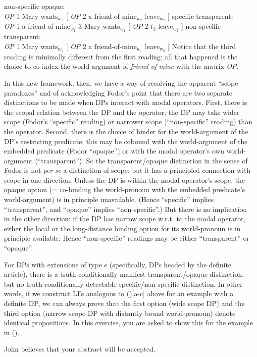 \pex
\a non-specific opaque:\\
\emph{OP} 1 Mary wants$_{w_1}$ [ \emph{OP} 2 a friend-of-mine$_{w_2}$ leave$_{w_2}$ ]
\a specific transparent:\\
\emph{OP} 1 a friend-of-mine$_{w_1}$ 3 Mary wants$_{w_1}$ [ \emph{OP} 2 $t_3$ leave$_{w_2}$
]
\a non-specific transparent:\\
\emph{OP} 1 Mary wants$_{w_1}$ [ \emph{OP} 2 a friend-of-mine$_{w_1}$ leave$_{w_2}$ ]
\xe
%
Notice that the third reading is minimally different from the first reading: all
that happened is the choice to co-index the world argument of \emph{friend of
  mine} with the matrix \emph{OP}.

In this new framework, then, we have a way of resolving the apparent ``scope
paradoxes'' and of acknowledging Fodor's point that there are two separate
distinctions to be made when DPs interact with modal operators. First, there is
the scopal relation between the DP and the operator; the DP may take wider scope
(Fodor's ``specific'' reading) or narrower scope (``non-specific'' reading) than
the operator. Second, there is the choice of binder for the world-argument of
the DP's restricting predicate; this may be cobound with the world-argument of
the embedded predicate (Fodor ``opaque'') or with the modal operator's own
world-argument (``transparent''). So the transparent/opaque distinction in the
sense of Fodor is not \emph{per se} a distinction of scope; but it has a
principled connection with scope in one direction: Unless the DP is within the
modal operator's scope, the opaque option (= co-binding the world-pronoun with
the embedded predicate's world-argument) is in principle unavailable. (Hence
``specific'' implies ``transparent'', and ``opaque'' implies ``non-specific''.)
But there is no implication in the other direction: if the DP has narrow scope
w.r.t. to the modal operator, either the local or the long-distance binding
option for its world-pronoun is in principle available. Hence ``non-specific''
readings may be either ``transparent'' or ``opaque''.

\begin{exercise}\label{yourabstract}
	
	For DPs with extensions of type $e$ (specifically, DPs headed by the definite
  article), there is a truth-conditionally manifest transparent/opaque
  distinction, but no truth-conditionally detectable specific/non-specific
  distinction. In other words, if we construct LFs analogous to (\lastx)[a-c]
  above for an example with a definite DP, we can always prove that the first
  option (wide scope DP) and the third option (narrow scope DP with distantly
  bound world-pronoun) denote identical propositions. In this exercise, you are
  asked to show this for the example in (\nextx).
	
	\ex John believes that your abstract will be accepted. \eex \xe

\end{exercise}

